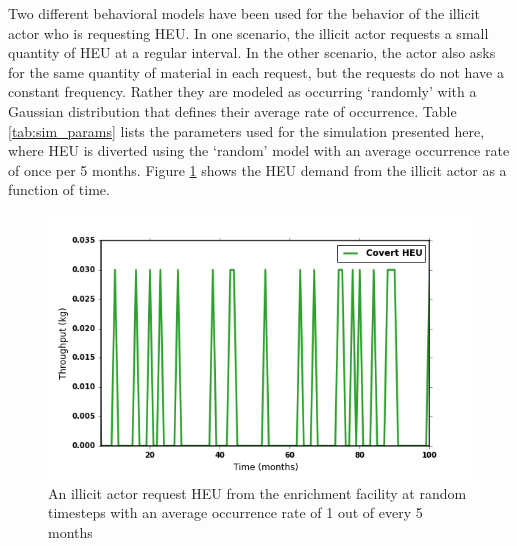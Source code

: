 Two different behavioral models have been used for the behavior of the illicit actor who is requesting \gls{HEU}. In one scenario, the illicit actor requests a small quantity of \gls{HEU} at a regular interval.  In the other scenario, the actor also asks for the same quantity of material in each request, but the requests do not have a constant frequency. Rather they are modeled as occurring `randomly' with a Gaussian distribution that defines their average rate of occurrence.
Table \ref{tab:sim_params} lists the parameters used for the simulation presented here, where \gls{HEU} is diverted using the `random' model with an average occurrence rate of once per 5 months.  Figure \ref{fig:heu_demand} shows the \gls{HEU} demand from the illicit actor as a function of time.  

\begin{figure}
\begin{center}
\includegraphics[natwidth=162bp,natheight=227bp, scale=0.7]{./figs/HEU_R5.png}
\end{center}
\caption{An illicit actor request \gls{HEU} from the enrichment facility at random timesteps with an average occurrence rate of 1 out of every 5 months}
\label{fig:heu_demand}
\end{figure}

